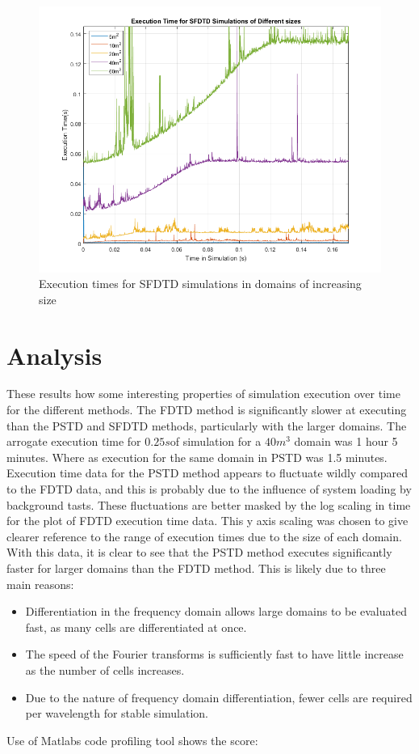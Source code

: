 \begin{figure}[H]
\centering
  \includegraphics[width=\textwidth]{./graphics/SFDTD simulation execution time.png}
  \caption{Execution times for SFDTD simulations in domains of increasing size}
\end{figure}

\section{Analysis}
These results how some interesting properties of simulation execution over time for the different methods. The FDTD method is significantly slower at executing than the PSTD and SFDTD methods, particularly with the larger domains. The arrogate execution time for $0.25s $of simulation for a $40m^3$ domain was 1 hour 5 minutes. Where as execution for the same domain in PSTD was 1.5 minutes. Execution time data for the PSTD method appears to fluctuate wildly compared to the FDTD data, and this is probably due to the influence of system loading by background tasts. These fluctuations are better masked by the log scaling in time for the plot of FDTD execution time data. This y axis scaling was chosen to give clearer reference to the range of execution times due to the size of each domain.\\

With this data, it is clear to see that the PSTD method executes significantly faster for larger domains than the FDTD method. This is likely due to three main reasons: \\
\begin{itemize}
\item Differentiation in the frequency domain allows large domains to be evaluated fast, as many cells are differentiated at once.
\item The speed of the Fourier transforms is sufficiently fast to have little increase as the number of cells increases. 
\item Due to the nature of frequency domain differentiation, fewer cells are required per wavelength for stable simulation.
\end{itemize}

Use of Matlabs code profiling tool shows the score:\\
